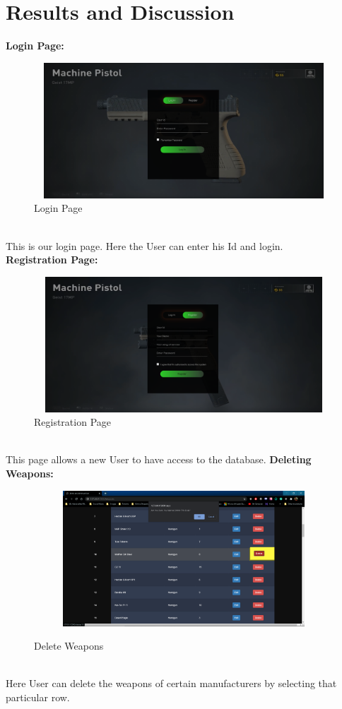 \documentclass[12pt,a4paper]{report}
\begin{document}
\chapter{Results and Discussion}
\textbf{Login Page:}\\
\begin{figure}[hbtp]
\centering
\includegraphics[width=4.5in,height=2in]{../fig/Log}
\caption{Login Page}
\end{figure}\\
\noindent
This is our login page. Here the User can enter his Id and login.\\
\textbf{Registration Page:}\\
\begin{figure}[hbtp]
\centering
\includegraphics[width=4.5in,height=2in]{../fig/Reg}
\caption{Registration Page}
\end{figure}\\
\noindent
This page allows a new User to have access to the database.
\newpage
\textbf{Deleting Weapons:}\\
\begin{figure}[hbtp]
\centering
\includegraphics[width=6in,height=2in]{../fig/deletee}\\
\caption{Delete Weapons}
\end{figure}\\
\noindent
Here User can delete the weapons of certain manufacturers by selecting that particular row.\\
\end{document}
